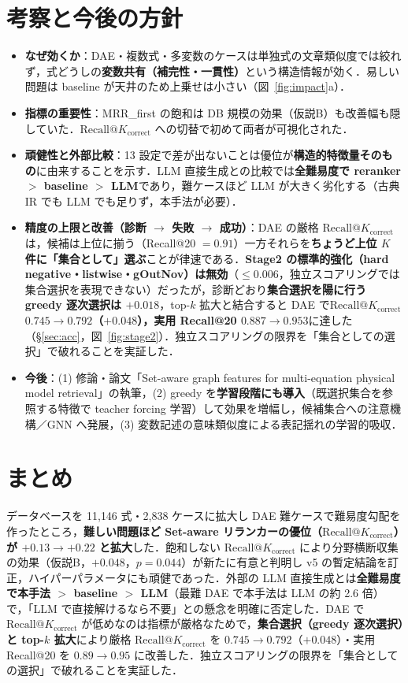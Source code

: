 \documentclass[11pt,a4paper]{ltjsarticle}
\makeatletter
\newcommand{\rkc}{\textrm{Recall@}K_{\textrm{correct}}}
\makeatother
\begin{document}
\section{考察と今後の方針}
\begin{itemize}[leftmargin=1.4em, nosep]
  \item \textbf{なぜ効くか}：DAE・複数式・多変数のケースは単独式の文章類似度では絞れず，式どうしの\textbf{変数共有（補完性・一貫性）}という構造情報が効く．易しい問題は baseline が天井のため上乗せは小さい（図~\ref{fig:impact}a）．
  \item \textbf{指標の重要性}：MRR\_first の飽和は DB 規模の効果（仮説B）も改善幅も隠していた．$\rkc$ への切替で初めて両者が可視化された．
  \item \textbf{頑健性と外部比較}：13 設定で差が出ないことは優位が\textbf{構造的特徴量そのもの}に由来することを示す．LLM 直接生成との比較では\textbf{全難易度で reranker $>$ baseline $>$ LLM}であり，難ケースほど LLM が大きく劣化する（古典 IR でも LLM でも足りず，本手法が必要）．
  \item \textbf{精度の上限と改善（診断 $\to$ 失敗 $\to$ 成功）}：DAE の厳格 $\rkc$ は，候補は上位に揃う（Recall@20 $=0.91$）一方それらを\textbf{ちょうど上位 $K$ 件に「集合として」選ぶ}ことが律速である．\textbf{Stage2 の標準的強化（hard negative・listwise・gOutNov）は無効}（$\le 0.006$，独立スコアリングでは集合選択を表現できない）だったが，診断どおり\textbf{集合選択を陽に行う greedy 逐次選択は $+0.018$}，top-$k$ 拡大と結合すると DAE で\textbf{$\rkc$ $0.745\to0.792$（$+0.048$），実用 Recall@20 $0.887\to0.953$}に達した（\S\ref{sec:acc}，図~\ref{fig:stage2}）．独立スコアリングの限界を「集合としての選択」で破れることを実証した．
  \item \textbf{今後}：(1) 修論・論文「Set-aware graph features for multi-equation physical model retrieval」の執筆，(2) greedy を\textbf{学習段階にも導入}（既選択集合を参照する特徴で teacher forcing 学習）して効果を増幅し，候補集合への注意機構／GNN へ発展，(3) 変数記述の意味類似度による表記揺れの学習的吸収．
\end{itemize}

\section{まとめ}
データベースを 11{,}146 式・2{,}838 ケースに拡大し DAE 難ケースで難易度勾配を作ったところ，\textbf{難しい問題ほど Set-aware リランカーの優位（$\rkc$）が $+0.13\to+0.22$ と拡大}した．飽和しない $\rkc$ により分野横断収集の効果（仮説B，$+0.048$，$p=0.044$）が新たに有意と判明し v5 の暫定結論を訂正，ハイパーパラメータにも頑健であった．外部の LLM 直接生成とは\textbf{全難易度で本手法 $>$ baseline $>$ LLM}（最難 DAE で本手法は LLM の約 2.6 倍）で，「LLM で直接解けるなら不要」との懸念を明確に否定した．DAE で $\rkc$ が低めなのは指標が厳格なためで，\textbf{集合選択（greedy 逐次選択）と top-$k$ 拡大}により厳格 $\rkc$ を $0.745\to0.792$（$+0.048$）・実用 Recall@20 を $0.89\to0.95$ に改善した．独立スコアリングの限界を「集合としての選択」で破れることを実証した．
\end{document}
